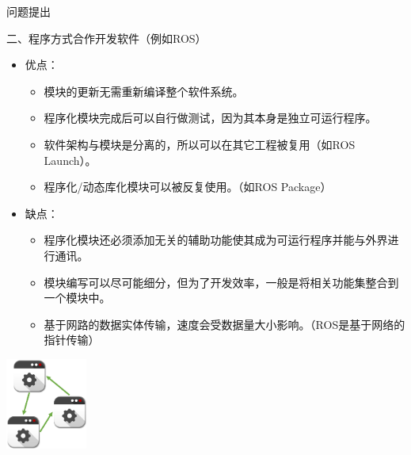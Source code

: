 \documentclass[9pt]{beamer}
\begin{document}
	\begin{frame}{问题提出}
		\begin{block}{二、程序方式合作开发软件（例如ROS）}
			\begin{itemize}
				\item<2-> 优点：
				\begin{itemize}
					\item 模块的更新无需重新编译整个软件系统。
					\item 程序化模块完成后可以自行做测试，因为其本身是独立可运行程序。
					\item 软件架构与模块是分离的，所以可以在其它工程被复用（如ROS Launch）。
					\item 程序化/动态库化模块可以被反复使用。（如ROS Package）
				\end{itemize}
				\item<3-> 缺点：
				\begin{itemize}
					\item 程序化模块还必须添加无关的辅助功能使其成为可运行程序并能与外界进行通讯。
					\item 模块编写可以尽可能细分，但为了开发效率，一般是将相关功能集整合到一个模块中。
					\item 基于网路的数据实体传输，速度会受数据量大小影响。（ROS是基于网络的指针传输）
				\end{itemize}
			\end{itemize}
		\end{block}
		\begin{center}
			\includegraphics[width=0.2\textwidth]{./img/way2}
		\end{center}
	\end{frame}
	
\end{document}
